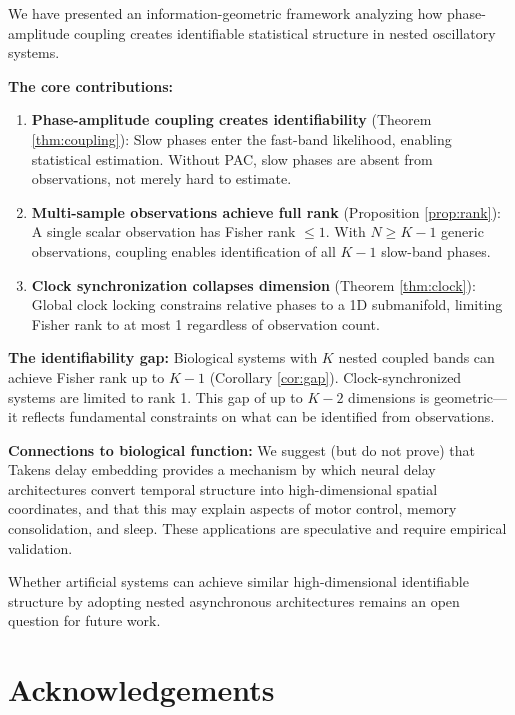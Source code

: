 \documentclass[12pt]{article}
\begin{document}
We have presented an information-geometric framework analyzing how phase-amplitude coupling creates identifiable statistical structure in nested oscillatory systems.

\textbf{The core contributions:}

\begin{enumerate}
    \item \textbf{Phase-amplitude coupling creates identifiability} (Theorem \ref{thm:coupling}): Slow phases enter the fast-band likelihood, enabling statistical estimation. Without PAC, slow phases are absent from observations, not merely hard to estimate.

    \item \textbf{Multi-sample observations achieve full rank} (Proposition \ref{prop:rank}): A single scalar observation has Fisher rank $\leq 1$. With $N \geq K-1$ generic observations, coupling enables identification of all $K-1$ slow-band phases.

    \item \textbf{Clock synchronization collapses dimension} (Theorem \ref{thm:clock}): Global clock locking constrains relative phases to a 1D submanifold, limiting Fisher rank to at most 1 regardless of observation count.
\end{enumerate}

\textbf{The identifiability gap:} Biological systems with $K$ nested coupled bands can achieve Fisher rank up to $K-1$ (Corollary \ref{cor:gap}). Clock-synchronized systems are limited to rank 1. This gap of up to $K-2$ dimensions is geometric---it reflects fundamental constraints on what can be identified from observations.

\textbf{Connections to biological function:} We suggest (but do not prove) that Takens delay embedding provides a mechanism by which neural delay architectures convert temporal structure into high-dimensional spatial coordinates, and that this may explain aspects of motor control, memory consolidation, and sleep. These applications are speculative and require empirical validation.

Whether artificial systems can achieve similar high-dimensional identifiable structure by adopting nested asynchronous architectures remains an open question for future work.

\section*{Acknowledgements}
\end{document}
